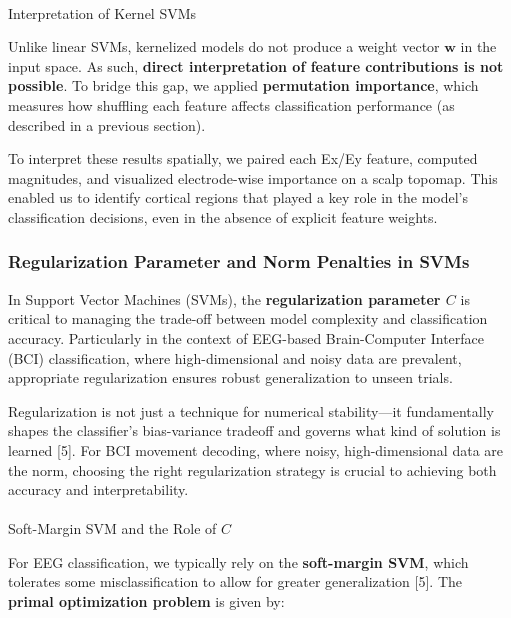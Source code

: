 \documentclass[
  letterpaper,
  DIV=11,
  numbers=noendperiod]{scrartcl}
\makeatletter
\let\oldparagraph\paragraph
\renewcommand{\paragraph}{
    \@ifstar
      \xxxParagraphStar
      \xxxParagraphNoStar
  }
\newcommand{\xxxParagraphStar}[1]{\oldparagraph*{#1}\mbox{}}
\newcommand{\xxxParagraphNoStar}[1]{\oldparagraph{#1}\mbox{}}
\makeatother
\begin{document}
\paragraph{Interpretation of Kernel
SVMs}\label{interpretation-of-kernel-svms}

Unlike linear SVMs, kernelized models do not produce a weight vector
\(\mathbf{w}\) in the input space. As such, \textbf{direct
interpretation of feature contributions is not possible}. To bridge this
gap, we applied \textbf{permutation importance}, which measures how
shuffling each feature affects classification performance (as described
in a previous section).

To interpret these results spatially, we paired each Ex/Ey feature,
computed magnitudes, and visualized electrode-wise importance on a scalp
topomap. This enabled us to identify cortical regions that played a key
role in the model's classification decisions, even in the absence of
explicit feature weights.

\subsubsection{Regularization Parameter and Norm Penalties in
SVMs}\label{regularization-parameter-and-norm-penalties-in-svms}

In Support Vector Machines (SVMs), the \textbf{regularization parameter
\(C\)} is critical to managing the trade-off between model complexity
and classification accuracy. Particularly in the context of EEG-based
Brain-Computer Interface (BCI) classification, where high-dimensional
and noisy data are prevalent, appropriate regularization ensures robust
generalization to unseen trials.

Regularization is not just a technique for numerical stability---it
fundamentally shapes the classifier's bias-variance tradeoff and governs
what kind of solution is learned {[}5{]}. For BCI movement decoding,
where noisy, high-dimensional data are the norm, choosing the right
regularization strategy is crucial to achieving both accuracy and
interpretability.

\paragraph{\texorpdfstring{Soft-Margin SVM and the Role of
\(C\)}{Soft-Margin SVM and the Role of C}}\label{soft-margin-svm-and-the-role-of-c}

For EEG classification, we typically rely on the \textbf{soft-margin
SVM}, which tolerates some misclassification to allow for greater
generalization {[}5{]}. The \textbf{primal optimization problem} is
given by:
\end{document}

